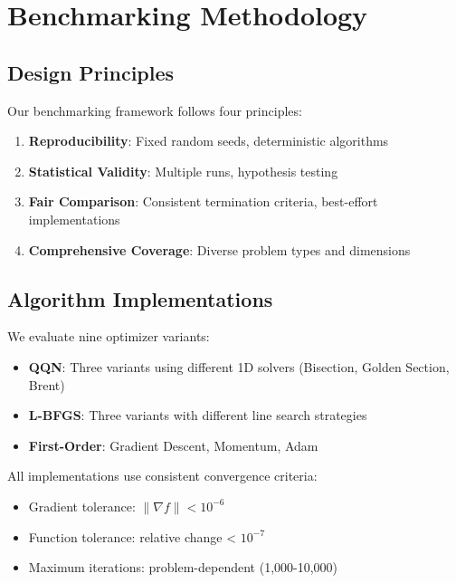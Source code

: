 \hypertarget{benchmarking-methodology}{%
\section{Benchmarking Methodology}\label{benchmarking-methodology}}

\hypertarget{design-principles}{%
\subsection{Design Principles}\label{design-principles}}

Our benchmarking framework follows four principles:

\begin{enumerate}
\def\labelenumi{\arabic{enumi}.}
\tightlist
\item
  \textbf{Reproducibility}: Fixed random seeds, deterministic algorithms
\item
  \textbf{Statistical Validity}: Multiple runs, hypothesis testing
\item
  \textbf{Fair Comparison}: Consistent termination criteria, best-effort implementations
\item
  \textbf{Comprehensive Coverage}: Diverse problem types and dimensions
\end{enumerate}

\hypertarget{algorithm-implementations}{%
\subsection{Algorithm Implementations}\label{algorithm-implementations}}

We evaluate nine optimizer variants:

\begin{itemize}
\tightlist
\item
  \textbf{QQN}: Three variants using different 1D solvers (Bisection, Golden Section, Brent)
\item
  \textbf{L-BFGS}: Three variants with different line search strategies
\item
  \textbf{First-Order}: Gradient Descent, Momentum, Adam
\end{itemize}

All implementations use consistent convergence criteria:

\begin{itemize}
\tightlist
\item
  Gradient tolerance: \(\|\nabla f\| < 10^{-6}\)
\item
  Function tolerance: relative change \textless{} \(10^{-7}\)
\item
  Maximum iterations: problem-dependent (1,000-10,000)
\end{itemize}

